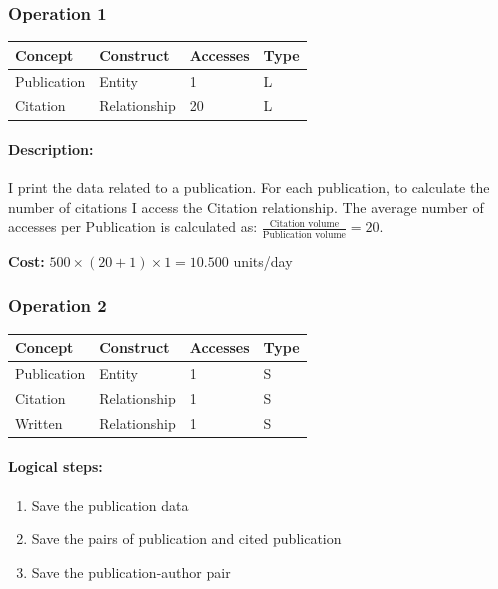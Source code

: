 \documentclass[a4paper,12pt]{article}
\begin{document}
\subsubsection*{Operation 1}
\begin{tabular}{llll}
\toprule
\textbf{Concept} & \textbf{Construct} & \textbf{Accesses} & \textbf{Type} \\
\midrule
Publication & Entity    & 1  & L \\
Citation     & Relationship & 20 & L \\
\bottomrule
\end{tabular}

\paragraph{Description:} 
I print the data related to a publication. For each publication, to calculate the number of citations I access the Citation relationship. The average number of accesses per Publication is calculated as: $\frac{\text{Citation volume}}{\text{Publication volume}} = 20$.

\medskip
\textbf{Cost:} $500 \times (20 + 1) \times 1 = 10.500$ units/day

\subsubsection*{Operation 2}
\begin{tabular}{llll}
\toprule
\textbf{Concept} & \textbf{Construct} & \textbf{Accesses} & \textbf{Type} \\
\midrule
Publication & Entity & 1 & S \\
Citation          & Relationship & 1 & S \\
Written        & Relationship & 1 & S \\
\bottomrule
\end{tabular}

\paragraph{Logical steps:}
\begin{enumerate}[label=\textbf{\arabic*)}, start=1, leftmargin=1.5cm]
    \item Save the publication data
    \item Save the pairs of publication and cited publication
    \item Save the publication-author pair
\end{enumerate}
\end{document}
